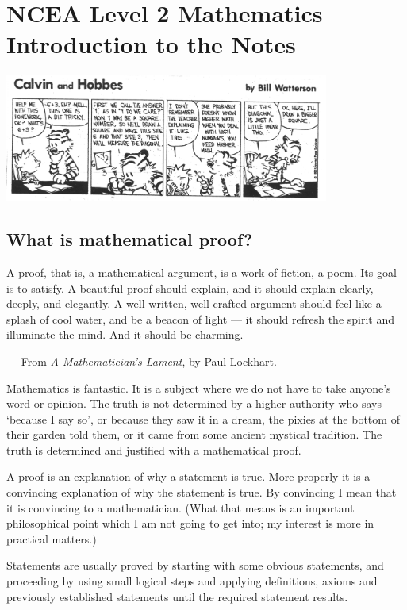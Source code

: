 


\section*{NCEA Level 2 Mathematics\\Introduction to the Notes}

\begin{center}
  \includegraphics[width=0.8\textwidth]{hobbes}
\end{center}

\subsection*{What is mathematical proof?}
A proof, that is, a mathematical argument, is a work of fiction, a poem. Its goal is to satisfy. A beautiful proof should explain, and it should explain clearly, deeply, and elegantly. A well-written, well-crafted argument should feel like a splash of cool water, and be a beacon of light --- it should refresh the spirit and illuminate the mind. And it should be charming.
\begin{flushright}--- From \emph{A Mathematician's Lament}, by Paul Lockhart.\end{flushright}

Mathematics is fantastic. It is a subject where we do not have to take anyone’s word or
opinion. The truth is not determined by a higher authority who says ‘because I say so’,
or because they saw it in a dream, the pixies at the bottom of their garden told them, or
it came from some ancient mystical tradition. The truth is determined and justified with a
mathematical proof.

A proof is an explanation of why a statement is true. More properly it is a convincing
explanation of why the statement is true. By convincing I mean that it is convincing to
a mathematician. (What that means is an important philosophical point which I am not
going to get into; my interest is more in practical matters.)

Statements are usually proved by starting with some obvious statements, and proceeding
by using small logical steps and applying definitions, axioms and previously established
statements until the required statement results.

